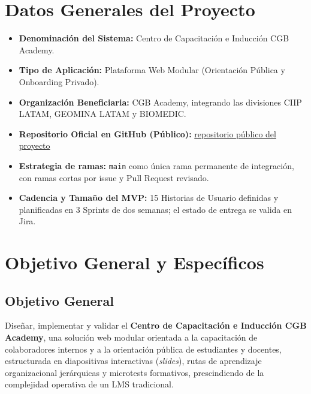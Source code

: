\documentclass[11pt,a4paper]{article}
\begin{document}
\tableofcontents
\newpage

\section{Datos Generales del Proyecto}
\begin{itemize}[leftmargin=*]
    \item \textbf{Denominación del Sistema:} Centro de Capacitación e Inducción CGB Academy.
    \item \textbf{Tipo de Aplicación:} Plataforma Web Modular (Orientación Pública y Onboarding Privado).
    \item \textbf{Organización Beneficiaria:} CGB Academy, integrando las divisiones CIIP LATAM, GEOMINA LATAM y BIOMEDIC.
    \item \textbf{Repositorio Oficial en GitHub (Público):} \href{https://github.com/milith0kun/proyecto-ing-software}{repositorio público del proyecto}
    \item \textbf{Estrategia de ramas:} \texttt{main} como única rama permanente de integración, con ramas cortas por issue y Pull Request revisado.
    \item \textbf{Cadencia y Tamaño del MVP:} 15 Historias de Usuario definidas y planificadas en 3 Sprints de dos semanas; el estado de entrega se valida en Jira.
\end{itemize}

\section{Objetivo General y Específicos}
\subsection{Objetivo General}
Diseñar, implementar y validar el \textbf{Centro de Capacitación e Inducción CGB Academy}, una solución web modular orientada a la capacitación de colaboradores internos y a la orientación pública de estudiantes y docentes, estructurada en diapositivas interactivas (\textit{slides}), rutas de aprendizaje organizacional jerárquicas y microtests formativos, prescindiendo de la complejidad operativa de un LMS tradicional.
\end{document}
